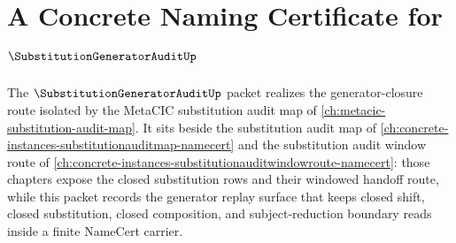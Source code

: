 \chapter{A Concrete Naming Certificate for $\SubstitutionGeneratorAuditUp$}
\label{ch:concrete-instances-substitutiongeneratoraudit-namecert}

The $\SubstitutionGeneratorAuditUp$ packet realizes the generator-closure route isolated by the MetaCIC substitution audit map of \autoref{ch:metacic-substitution-audit-map}. It sits beside the substitution audit map of \autoref{ch:concrete-instances-substitutionauditmap-namecert} and the substitution audit window route of \autoref{ch:concrete-instances-substitutionauditwindowroute-namecert}: those chapters expose the closed substitution rows and their windowed handoff route, while this packet records the generator replay surface that keeps closed shift, closed substitution, closed composition, and subject-reduction boundary reads inside a finite NameCert carrier.


